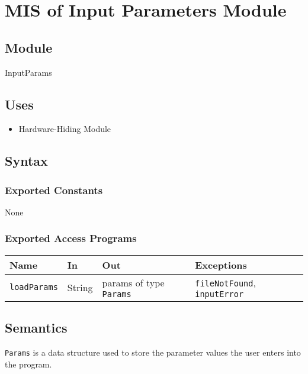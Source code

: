 \documentclass[12pt, titlepage]{article}
\begin{document}


\section{MIS of Input Parameters Module} \label{MISInpParam}

\subsection{Module}
InputParams 

\subsection{Uses}
\begin{itemize}
  \item Hardware-Hiding Module
\end{itemize}

\subsection{Syntax}

\subsubsection{Exported Constants}
None 

\subsubsection{Exported Access Programs}
\begin{center}
\begin{tabular}{p{3cm} p{4cm} p{4cm} p{3cm}}
\hline
\textbf{Name} & \textbf{In} & \textbf{Out} & \textbf{Exceptions} \\
\hline
\texttt{loadParams} & String & params of type \texttt{Params} & \texttt{fileNotFound}, \texttt{inputError} \\
\hline
\end{tabular}
\end{center}

\subsection{Semantics}
\texttt{Params} is a data structure used to store the parameter values the user enters into the program. 
\end{document}
